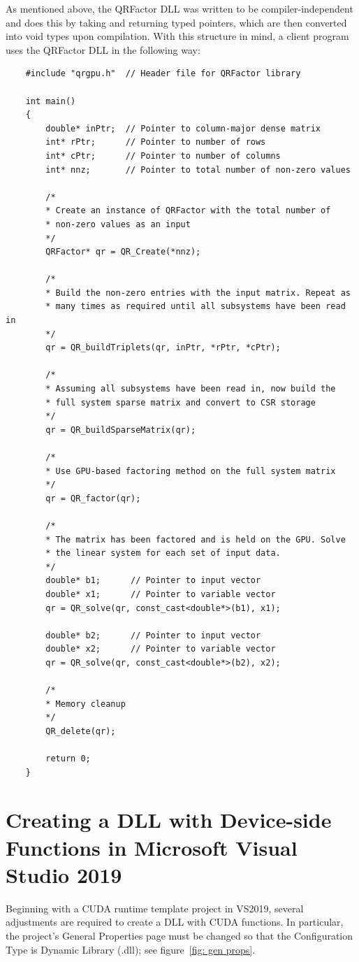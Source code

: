 \documentclass[11pt,letterpaper]{article}
\begin{document}
As mentioned above, the QRFactor DLL was written to be compiler-independent and does this by taking and returning typed pointers, which are then converted into void types upon compilation. With this structure in mind, a client program uses the QRFactor DLL in the following way:
\begin{verbatim}
    #include "qrgpu.h"  // Header file for QRFactor library

    int main()
    {
        double* inPtr;  // Pointer to column-major dense matrix  
        int* rPtr;      // Pointer to number of rows
        int* cPtr;      // Pointer to number of columns
        int* nnz;       // Pointer to total number of non-zero values

        /*
        * Create an instance of QRFactor with the total number of
        * non-zero values as an input
        */
        QRFactor* qr = QR_Create(*nnz);

        /*
        * Build the non-zero entries with the input matrix. Repeat as
        * many times as required until all subsystems have been read in
        */ 
        qr = QR_buildTriplets(qr, inPtr, *rPtr, *cPtr);
        
        /*
        * Assuming all subsystems have been read in, now build the
        * full system sparse matrix and convert to CSR storage
        */
        qr = QR_buildSparseMatrix(qr);

        /*
        * Use GPU-based factoring method on the full system matrix
        */
        qr = QR_factor(qr);
    
        /* 
        * The matrix has been factored and is held on the GPU. Solve 
        * the linear system for each set of input data.
        */
        double* b1;      // Pointer to input vector
        double* x1;      // Pointer to variable vector
        qr = QR_solve(qr, const_cast<double*>(b1), x1);

        double* b2;      // Pointer to input vector
        double* x2;      // Pointer to variable vector
        qr = QR_solve(qr, const_cast<double*>(b2), x2);

        /*
        * Memory cleanup
        */
        QR_delete(qr);

        return 0;
    }
\end{verbatim}


\section{Creating a DLL with Device-side Functions in Microsoft Visual Studio 2019}
\label{sec: gpu dll}
Beginning with a CUDA runtime template project in VS2019, several adjustments are required to create a DLL with CUDA functions. In particular, the project's General Properties page must be changed so that the Configuration Type is Dynamic Library (.dll); see figure~\ref{fig: gen props}.
\end{document}
